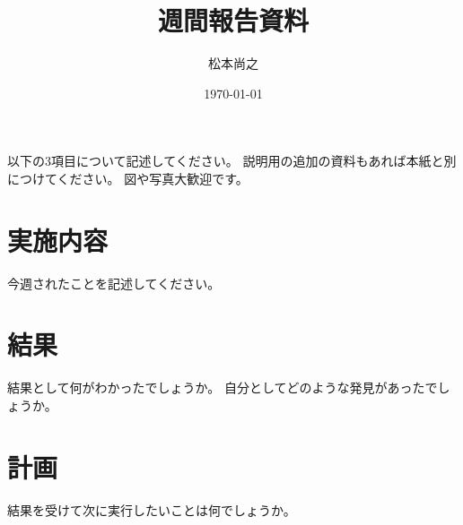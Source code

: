 \documentclass[uplatex]{jarticle}
\title{週間報告資料}
\author{松本尚之}
\date{\today}
\begin{document}
\maketitle

以下の3項目について記述してください。
説明用の追加の資料もあれば本紙と別につけてください。
図や写真大歓迎です。

\section{実施内容}

今週されたことを記述してください。


\section{結果}
結果として何がわかったでしょうか。
自分としてどのような発見があったでしょうか。


\section{計画}
結果を受けて次に実行したいことは何でしょうか。
\end{document}
